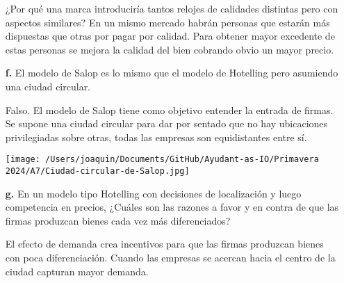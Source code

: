 \documentclass{exam}
\begin{document}
\begin{itemize}
\begin{solution}
\begin{center}
        \end{center}
        ¿Por qué una marca introduciría tantos relojes de calidades distintas pero con aspectos similares? En un mismo mercado habrán personas que estarán más dispuestas que otras por pagar por calidad. Para obtener mayor excedente de estas personas se mejora la calidad del bien cobrando obvio un mayor precio.
        
    \end{solution}

    \item[\textbf{f.}] El modelo de Salop es lo mismo que el modelo de Hotelling pero asumiendo una ciudad circular.
    \begin{solution}
        Falso. El modelo de Salop tiene como objetivo entender la entrada de firmas. Se supone una ciudad circular para dar por sentado que no hay ubicaciones privilegiadas sobre otras, todas las empresas son equidistantes entre sí. 
        \begin{center}
            \texttt{[image: /Users/joaquin/Documents/GitHub/Ayudant-as-IO/Primavera 2024/A7/Ciudad-circular-de-Salop.jpg]}
        \end{center}
    \end{solution}
    \item[\textbf{g.}] En un modelo tipo Hotelling con decisiones de localización y luego competencia en precios, ¿Cuáles son las razones a favor y en contra de que las firmas produzcan bienes cada vez más diferenciados?
    \begin{solution}
        El efecto de demanda crea incentivos para que las firmas produzcan bienes con poca diferenciación. Cuando las empresas se acercan hacia el centro de la ciudad capturan mayor demanda.
        

\end{solution}
\end{itemize}
\end{document}
